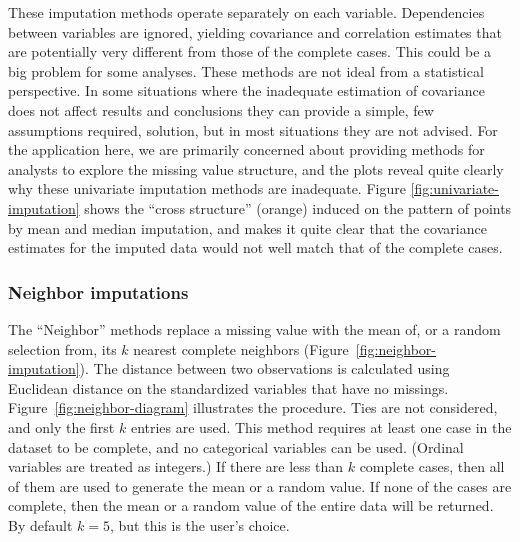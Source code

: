 \documentclass[article]{jss}
\begin{document}
These imputation methods operate separately on each variable.  Dependencies between variables are ignored, yielding covariance and correlation estimates that are potentially very different from those of the complete cases. This could be a big problem for some analyses. These methods are not ideal from a statistical perspective.  In some situations where the inadequate estimation of covariance does not affect results and conclusions they can provide a simple, few assumptions required, solution, but in most situations they are not advised. For the application here, we are primarily concerned about providing methods for analysts to explore the missing value structure, and the plots reveal quite clearly why these univariate imputation methods are inadequate. Figure \ref{fig:univariate-imputation} shows the ``cross structure'' (orange) induced on the pattern of points by mean and median imputation, and makes it quite clear that the covariance estimates for the imputed data would not well match that of the complete cases. 

\subsubsection{Neighbor imputations}


The ``Neighbor'' methods replace a missing value with the mean of, or a random selection from, its $k$ nearest complete neighbors (Figure~\ref{fig:neighbor-imputation}). The distance between two observations is calculated using Euclidean distance on the standardized variables that have no missings. Figure~\ref{fig:neighbor-diagram} illustrates the procedure. Ties are not considered, and only the first $k$ entries are used. This method requires at least one case in the dataset to be complete, and no categorical variables can be used. (Ordinal variables are treated as integers.) If there are less than $k$ complete cases, then all of them are used to generate the mean or a random value. If none of the cases are complete, then the mean or a random value of the entire data will be returned. By default $k=5$, but this is the user's choice.
\end{document}
